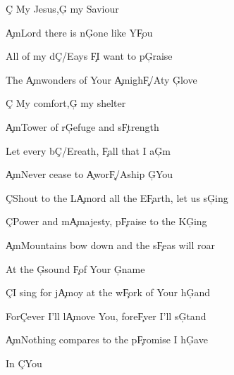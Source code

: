\documentclass[9pt]{extarticle}
\begin{document}
\bsong

\bv
\c{C} My Jesus,\c{G} my Saviour

\c{Am}Lord there is n\c{G}one like Y\c{F}ou

All of my d\c{C/E}ays \c{F}I want to p\c{G}raise

The \c{Am}wonders of Your \c{A\s }migh\c{F/A}ty \c{G}love
\ev

\bv
\c{C} My comfort,\c{G} my shelter

\c{Am}Tower of r\c{G}efuge and s\c{F}trength

Let every b\c{C/E}reath, \c{F}all that I a\c{G}m

\c{Am}Never cease to \c{A\s }wor\c{F/A}ship \c{G}You
\ev

\bc
\c{C}Shout to the L\c{Am}ord all the E\c{F}arth, let us s\c{G}ing

\c{C}Power and m\c{Am}ajesty, p\c{F}raise to the K\c{G}ing

\c{Am}Mountains bow down and the s\c{F}eas will roar

At the \c{G}sound \c{F}of Your \c{G}name

\c{C}I sing for j\c{Am}oy at the w\c{F}ork of Your h\c{G}and

For\c{C}ever I'll l\c{Am}ove You, fore\c{F}ver I'll s\c{G}tand

\c{Am}Nothing compares to the p\c{F}romise I h\c{G}ave

In \c{C}You
\ec




\esong
\end{document}
